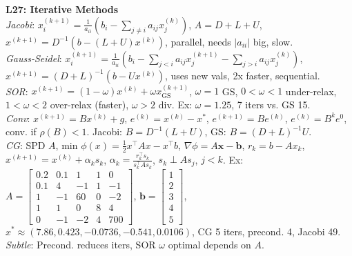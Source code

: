 \documentclass[9pt]{article}
\begin{document}
\begin{multicols}{3}
\textbf{L27: Iterative Methods} \\
\textit{Jacobi}: $x_i^{(k+1)}=\frac{1}{a_{ii}}(b_i-\sum_{j \neq i} a_{ij}x_j^{(k)})$, $A=D+L+U$, $x^{(k+1)}=D^{-1}(b-(L+U)x^{(k)})$, parallel, needs $|a_{ii}|$ big, slow. \\
\textit{Gauss-Seidel}: $x_i^{(k+1)}=\frac{1}{a_{ii}}(b_i-\sum_{j<i} a_{ij}x_j^{(k+1)}-\sum_{j>i} a_{ij}x_j^{(k)})$, $x^{(k+1)}=(D+L)^{-1}(b-Ux^{(k)})$, uses new vals, 2x faster, sequential. \\
\textit{SOR}: $x^{(k+1)}=(1-\omega)x^{(k)}+\omega x_{\text{GS}}^{(k+1)}$, $\omega=1$ GS, $0<\omega<1$ under-relax, $1<\omega<2$ over-relax (faster), $\omega>2$ div. Ex: $\omega=1.25$, 7 iters vs. GS 15. \\
\textit{Conv}: $x^{(k+1)}=Bx^{(k)}+g$, $e^{(k)}=x^{(k)}-x^*$, $e^{(k+1)}=Be^{(k)}$, $e^{(k)}=B^k e^0$, conv. if $\rho(B)<1$. Jacobi: $B=D^{-1}(L+U)$, GS: $B=(D+L)^{-1}U$. \\
\textit{CG}: SPD $A$, min $\phi(x)=\frac{1}{2}x^\top Ax-x^\top b$, $\nabla \phi=A\mathbf{x}-\mathbf{b}$, $r_k=b-Ax_k$, $x^{(k+1)}=x^{(k)}+\alpha_k s_k$, $\alpha_k=\frac{r_k^\top s_k}{s_k^\top A s_k}$, $s_k \perp A s_j$, $j<k$. Ex: $A=\begin{bmatrix}0.2&0.1&1&1&0\\0.1&4&-1&1&-1\\1&-1&60&0&-2\\1&1&0&8&4\\0&-1&-2&4&700\end{bmatrix}$, $\mathbf{b}=\begin{bmatrix}1\\2\\3\\4\\5\end{bmatrix}$, $x^* \approx (7.86,0.423,-0.0736,-0.541,0.0106)$, CG 5 iters, precond. 4, Jacobi 49. \\
\textit{Subtle}: Precond. reduces iters, SOR $\omega$ optimal depends on $A$.

\end{multicols}
\end{document}
